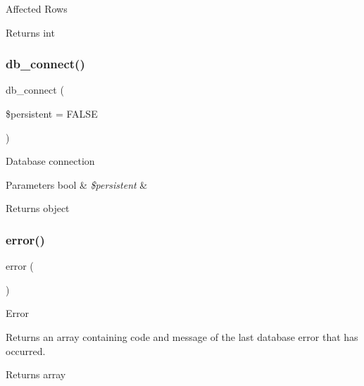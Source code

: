 Affected Rows

\begin{DoxyReturn}{Returns}
int 
\end{DoxyReturn}
\mbox{\label{class_c_i___d_b__pdo__driver_a52bf595e79e96cc0a7c907a9b45aeb4d}} 
\subsubsection{\texorpdfstring{db\+\_\+connect()}{db\_connect()}}
{\footnotesize\ttfamily db\+\_\+connect (\begin{DoxyParamCaption}\item[{}]{\$persistent = {\ttfamily FALSE} }\end{DoxyParamCaption})}

Database connection


\begin{DoxyParams}[1]{Parameters}
bool & {\em \$persistent} & \\
\hline
\end{DoxyParams}
\begin{DoxyReturn}{Returns}
object 
\end{DoxyReturn}
\mbox{\label{class_c_i___d_b__pdo__driver_a43b8d30b879d4f09ceb059b02af2bc02}} 
\subsubsection{\texorpdfstring{error()}{error()}}
{\footnotesize\ttfamily error (\begin{DoxyParamCaption}{ }\end{DoxyParamCaption})}

Error

Returns an array containing code and message of the last database error that has occurred.

\begin{DoxyReturn}{Returns}
array 
\end{DoxyReturn}
\mbox{\label{class_c_i___d_b__pdo__driver_ae61dc2c85e5516f143f6246c686bc3fc}} 
